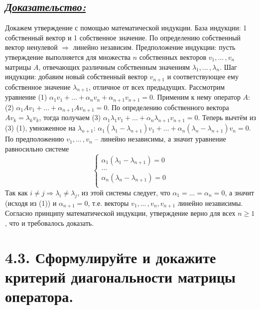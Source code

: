 \documentclass{article}
\begin{document}
\subsection*{\Large \underline{\textit{Доказательство: }}}
Докажем утверждение с помощью математической индукции. 
\newline База индукции: 1 собственный вектор и 1 собственное значение. По определению собственный вектор ненулевой $\Rightarrow$ линейно независим.
\newline Предположение индукции: пусть утверждение выполняется для множества $n$ собственных векторов $v_1, ...\,, v_n$ матрицы $A$, отвечающих различным собственным значениям $\lambda_1, ...\,, \lambda_n$.
\newline Шаг индукции: добавим новый собственный вектор $v_{n+1}$ и соответствующее ему собственное значение $\lambda_{n + 1}$, отличное от всех предыдущих. Рассмотрим уравнение (1) $\alpha_1v_1 + ... + \alpha_nv_n + \alpha_{n + 1}v_{n + 1} = 0$. Применим к нему оператор $A$: (2) $\alpha_1Av_1 + ... + \alpha_{n+1}Av_{n+1} = 0$. По определению собственного вектора $Av_k = \lambda_kv_k$, тогда получаем (3) $\alpha_1\lambda_1v_1 + ... + \alpha_n\lambda_{n+1}v_{n+1} = 0$. Теперь вычтём из (3) (1), умноженное на $\lambda_{n + 1}$: $\alpha_1(\lambda_1 - \lambda_{n+1})v_1 + ... + \alpha_n(\lambda_n - \lambda_{n+1})v_n = 0$. По предположению $v_1, ...\,, v_n$ -- линейно независимы, а значит уравнение равносильно системе
$$
\begin{cases}
\alpha_1(\lambda_1 - \lambda_{n+1}) = 0 \\
... \\
\alpha_n(\lambda_n - \lambda_{n + 1}) = 0 \\
\end{cases}
$$
Так как $i \ne j \Rightarrow \lambda_i \ne \lambda_j$, из этой системы следует, что $\alpha_1 = ... = \alpha_n = 0$, а значит (исходя из (1)) и $\alpha_{n + 1} = 0$, т.е. векторы $v_1, ...\,, v_n, v_{n+1}$ линейно независимы.
\newline Согласно принципу математической индукции, утверждение верно для всех 
\newline $n \ge 1$, что и требовалось доказать.

\section*{\LARGE 4.3. Сформулируйте и докажите критерий диагональности матрицы оператора.  }
\end{document}
